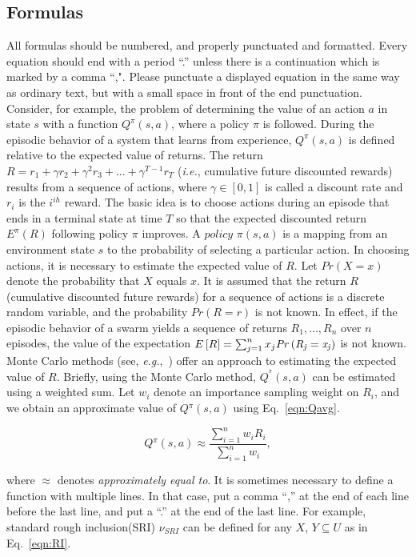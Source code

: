 \documentclass{llncs}
\begin{document}
\subsection{Formulas}
All formulas should be numbered, and properly punctuated and
formatted.   Every equation should end with a period ``.'' unless
there is a continuation which is marked by a comma ``,".  Please
punctuate a displayed equation in the same way as ordinary text, but
with a small space in front of the end punctuation.  Consider, for
example, the problem of determining the value of an action $a$ in
state $s$ with a function $Q^{\pi}(s,a)$, where a policy $\pi$ is
followed.  During the episodic behavior of a system that learns from
experience, $Q^{\pi}(s,a)$ is defined relative to the expected value
of returns.  The return $R = r_{1}  + \gamma r_{2}  + \gamma ^2
r_{3}  + ... + \gamma ^{T-1} r_{T}$ ({\em i.e.}, cumulative future
discounted rewards) results from a sequence of actions, where
$\gamma \in \left[0,1\right]$ is called a discount rate and $r_i$ is
the $i^{ih}$ reward.  The basic idea is to choose actions during an
episode that ends in a terminal state at time $T$ so that the
expected discounted return $E^\pi(R)$ following policy $\pi$
improves.  A $policy$ $\pi(s,a)$ is a mapping from an environment
state $s$ to the probability of selecting a particular action.  In
choosing actions, it is necessary to estimate the expected value of
$R$.  Let $Pr(X=x)$ denote the probability that $X$ equals $x$.  It
is assumed that the return $R$ (cumulative discounted future
rewards) for a sequence of actions is a discrete random variable,
and the probability $Pr(R = r)$ is not known.  In effect, if the
episodic behavior of a swarm yields a sequence of returns
$R_1,\dots,R_n$ over $n$ episodes, the value of the expectation
$E\left[ R \right] = \sum\nolimits_{j = 1}^n {x_j \it Pr \left( {R_j
= x_j } \right)}$ is not known.  Monte Carlo methods (see,
{\em e.g.},~\cite{Rubinstein81}) offer an approach to estimating the
expected value of $R$. Briefly, using the Monte Carlo method,
$Q^{^\pi}(s,a)$
can be estimated using a weighted sum. Let $w_i$ denote an
importance sampling weight on $R_i$, and we obtain an approximate
value of $Q{^\pi}(s,a)$ using Eq.~\ref{eqn:Qavg}.

\begin{equation}
\label{eqn:Qavg}
Q{^\pi}(s,a) \approx \frac{{\sum\nolimits_{i = 1}^n {w_i R_i } }}{{\sum\nolimits_{i = 1}^n {w_i } }},
\end{equation}

\noindent where $\approx$ denotes {\it approximately equal to}.  It is sometimes necessary to define a function with multiple lines.  In that case, put a comma ``,'' at the end of each line before the last line, and put a ``.'' at the end of the last line.  For example, standard rough inclusion(SRI) $\nu_{SRI}$ can be defined for any $X$, $Y  \subseteq  U$ as in Eq.~\ref{eqn:RI}.
\end{document}
